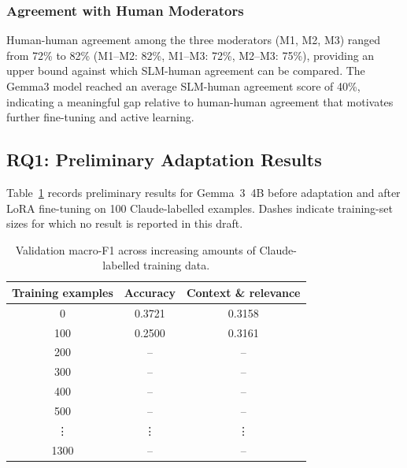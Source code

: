 \documentclass[11pt,a4paper]{article}
\begin{document}
\subsubsection{Agreement with Human Moderators}

Human-human agreement among the three moderators (M1, M2, M3) ranged from 72\% to 82\% (M1--M2: 82\%, M1--M3: 72\%, M2--M3: 75\%), providing an upper bound against which SLM-human agreement can be compared. The Gemma3 model reached an average SLM-human agreement score of 40\%, indicating a meaningful gap relative to human-human agreement that motivates further fine-tuning and active learning.

\subsection{RQ1: Preliminary Adaptation Results}
\label{subsec:rq1-adaptation-results}

Table~\ref{tab:claude_training_f1} records preliminary results for
Gemma~3~4B before adaptation and after LoRA fine-tuning on 100
Claude-labelled examples. Dashes indicate training-set sizes for which no
result is reported in this draft.
\begin{table}[htbp]
  \centering
  \caption{Validation macro-F1 across increasing amounts of Claude-labelled training data.}
  \label{tab:claude_training_f1}
  \begin{tabular}{c c c}
    \toprule
    \textbf{Training examples} & \textbf{Accuracy} & \textbf{Context \& relevance} \\ 
    \midrule
    0     & 0.3721 & 0.3158 \\
    100   & 0.2500 & 0.3161 \\
    200   & --     & --     \\
    300   & --     & --     \\
    400   & --     & --     \\
    500   & --     & --     \\
    \vdots & \vdots & \vdots \\
    1300  & --     & --     \\
    \bottomrule
  \end{tabular}
\end{table}
\end{document}
